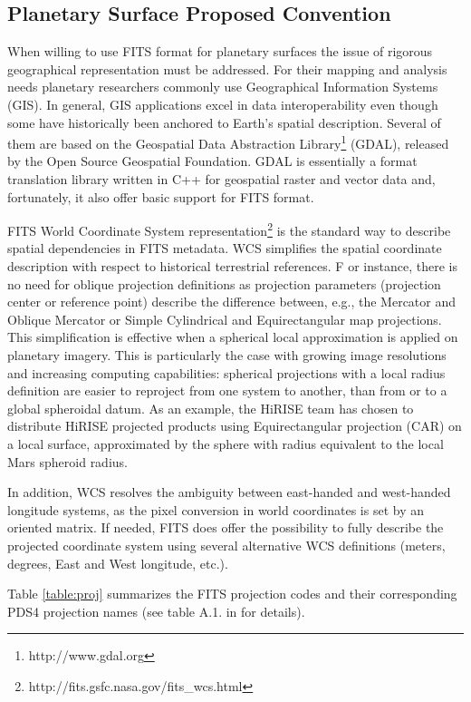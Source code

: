 \subsection{Planetary Surface Proposed Convention}
\label{ssec:geofits}
When willing to use FITS format for planetary surfaces the issue of rigorous
geographical representation must be addressed.
For their mapping and analysis needs planetary researchers commonly use
Geographical Information Systems (GIS).
In general, GIS applications excel in data interoperability even
though some have historically been anchored to Earth's spatial description.
Several of them are based on the Geospatial Data Abstraction
Library\footnote{http://www.gdal.org} (GDAL), released by the Open Source
Geospatial Foundation.
GDAL is essentially a format translation library written in C++ for geospatial raster
and vector data and, fortunately, it also offer basic support for FITS format.

FITS World Coordinate System
representation\footnote{http://fits.gsfc.nasa.gov/fits\_wcs.html} is the standard
way to describe spatial dependencies in FITS metadata.
WCS simplifies the spatial coordinate description with respect to historical
terrestrial references.
F
or instance, there is no need for oblique projection definitions
\citep{calagreisenI,Snyder1987} as projection parameters
(projection center or reference point)
describe the difference between, e.g., the Mercator and
Oblique Mercator or Simple Cylindrical and
Equirectangular map projections.
This simplification is effective when a spherical local approximation
is applied on planetary imagery.
This is particularly the case with growing image resolutions and
increasing computing capabilities: spherical projections with a local
radius definition are easier to reproject from one system to another, than
from or to a global spheroidal datum.
As an example, the HiRISE team has chosen to distribute HiRISE projected
products using Equirectangular projection (CAR) on a local surface, approximated
by the sphere with radius equivalent to the local Mars spheroid radius.

In addition, WCS resolves the ambiguity between east-handed and west-handed
longitude systems, as the pixel conversion in world coordinates is set by an
oriented matrix.
If needed, FITS does offer the possibility to fully describe the projected
coordinate system using several alternative WCS definitions (meters, degrees,
East and West longitude, etc.)\citep{greisencalaII}.

Table \ref{table:proj} summarizes the FITS projection codes and their
corresponding PDS4 projection names (see table A.1. in \citet{calagreisenI}
for details).

